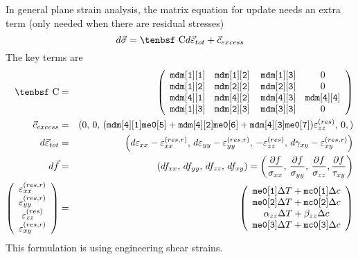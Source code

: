 \documentclass[11pt]{article}
\def\a#1{\alpha_{#1}}
\def\b#1{\beta_{#1}}
\def\C{\hbox{\tenbsf C}}
\def\cex{\vec{c}_{excess}}
\def\code#1{{\small\tt #1}}
\def\deff{d \vec{\varepsilon}_{tot}}
\def\df{d \vec{f}}
\def\dsig{d \vec{\sigma}}
\def\DT{\Delta T}
\def\e#1{\varepsilon_{#1}}
\def\er#1{\varepsilon_{#1}^{(res)}}
\def\err#1{\varepsilon_{#1}^{(res,r)}}
\def\g#1{\gamma_{#1}}
\begin{document}
In general plane strain analysis, the matrix equation for update needs an extra term (only needed when there are residual stresses)
\begin{equation}
    \dsig = \C \deff +\cex
\end{equation}
The key terms are
\begin{eqnarray}
      \C & = & \left(\begin{array}{cccc} \code{mdm[1][1]}  & \code{mdm[1][2]}  & \thinspace\code{mdm[1][3]}  & 0   \\
                    \code{mdm[1][2]}  & \code{mdm[2][2]}  & \thinspace\code{mdm[2][3]}  & 0 \\
                            \code{mdm[4][1]}  & \code{mdm[4][2]}  & \thinspace\code{mdm[4][3]}  & \code{mdm[4][4]}  \\
                 \code{mdm[1][3]}  & \code{mdm[2][3]}  & \thinspace\code{mdm[3][3]}  & 0 \end{array}\right)  \\
      \cex & = & (0, \thinspace 0, \thinspace (\code{mdm[4][1]}\code{me0[5]}
              + \code{mdm[4][2]}\code{me0[6]}+\code{mdm[4][3]}\code{me0[7]})\er{zz}, \thinspace 0,) \\
      \deff & = & \left(d\e{xx} - \err{xx}, \thinspace d\e{yy} - \err{yy}, \thinspace -  \er{zz}, 
              \thinspace d\g{xy}-\err{xy}\right) \\
      \df & = & (df_{xx}, \thinspace df_{yy}, \thinspace df_{zz}, \thinspace df_{xy})
                  = \left({\partial f\over \sigma_{xx}}, \thinspace {\partial f\over \sigma_{yy}}, \thinspace {\partial f\over \sigma_{zz}},
                                {\partial f\over \tau_{xy}}\right)  \\
\left(\begin{array}{c} \err{xx} \\ \err{yy} \\ \er{zz} \\ \err{xy} \end{array}\right)
       & = &  \left(\begin{array}{c}
	\code{me0[1]}\DT + \code{mc0[1]}\Delta c \\
	\code{me0[2]}\DT + \code{mc0[2]}\Delta c \\
	\a{zz}\DT + \b{zz}\Delta c \\
	\code{me0[3]}\DT + \code{mc0[3]}\Delta c  \end{array}\right) 
 \end{eqnarray}
This formulation is using engineering shear strains. 
 
\end{document}
